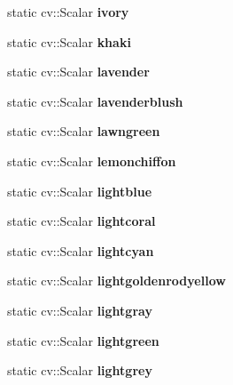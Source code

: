 \begin{DoxyCompactItemize}
static cv\+::\+Scalar {\bfseries ivory}
\item 
\mbox{\label{classColor_a4cad21d232e9b8e67720a9ee973dc35c}} 
static cv\+::\+Scalar {\bfseries khaki}
\item 
\mbox{\label{classColor_acc7ab79e8a0d74b55a9ee4a9cb16342c}} 
static cv\+::\+Scalar {\bfseries lavender}
\item 
\mbox{\label{classColor_a73d2b76cf2a4baeef64dae5b4bb651fc}} 
static cv\+::\+Scalar {\bfseries lavenderblush}
\item 
\mbox{\label{classColor_a2c88c24ea56b70572b093c9745a909f5}} 
static cv\+::\+Scalar {\bfseries lawngreen}
\item 
\mbox{\label{classColor_a3d6833193a1bdfc0f513aa7cdf715d3f}} 
static cv\+::\+Scalar {\bfseries lemonchiffon}
\item 
\mbox{\label{classColor_a2d80e8660f820375965861074463a56a}} 
static cv\+::\+Scalar {\bfseries lightblue}
\item 
\mbox{\label{classColor_ab25e29ca01649a18d7f34961039ba1d6}} 
static cv\+::\+Scalar {\bfseries lightcoral}
\item 
\mbox{\label{classColor_a6c70f8659c1b4d1d4e3f015d7604a905}} 
static cv\+::\+Scalar {\bfseries lightcyan}
\item 
\mbox{\label{classColor_aa5125313946431700bb608876f451ee9}} 
static cv\+::\+Scalar {\bfseries lightgoldenrodyellow}
\item 
\mbox{\label{classColor_aea9b1b5786369bbd9e8b016bd1fdf1a6}} 
static cv\+::\+Scalar {\bfseries lightgray}
\item 
\mbox{\label{classColor_aadc3aef0cdb0808b596bd85855eaca93}} 
static cv\+::\+Scalar {\bfseries lightgreen}
\item 
\mbox{\label{classColor_ac8f84a36f6defdf95dcc42fa739844b7}} 
static cv\+::\+Scalar {\bfseries lightgrey}
\item 

\end{DoxyCompactItemize}
